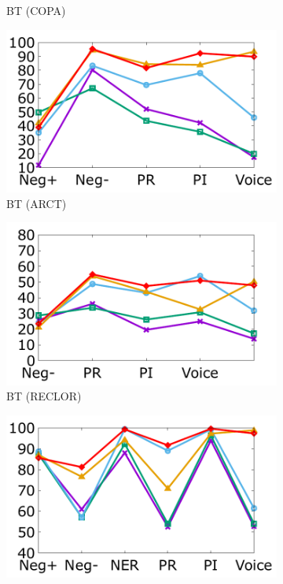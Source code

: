\begin{figure}[!th]
\begin{subfigure}[b]{0.23\textwidth}
\caption{BT (COPA)}
\label{fig:copa_bert}
\end{subfigure}
\hfill
\begin{subfigure}[b]{0.23\textwidth}
\centering
\includegraphics[width=\columnwidth]{data/arct_bert.pdf}
\caption{BT (ARCT)}
\label{fig:arct_bert}
\end{subfigure}
\hfill
\begin{subfigure}[b]{0.23\textwidth}
\centering
\includegraphics[width=\columnwidth]{data/reclor_bert.pdf}
\caption{BT (RECLOR)}
\label{fig:reclor_bert}
\end{subfigure}
\newpage
\begin{subfigure}[b]{0.23\textwidth}
\centering
\includegraphics[width=\columnwidth]{data/roc_xlnet.pdf}

\end{subfigure}
\end{figure}
